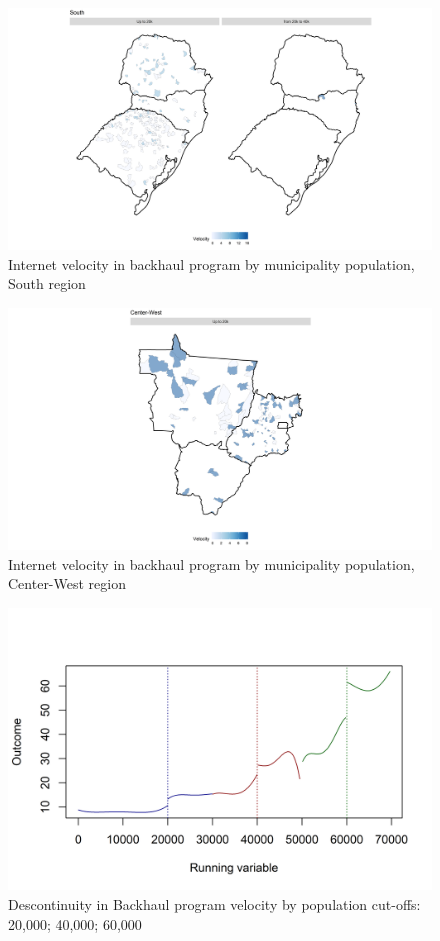 \documentclass[12pt,]{article}
\begin{document}
\begin{figure}
\centering
\includegraphics{artigo1_files/figure-latex/mapa4-1.png}
\caption{Internet velocity in backhaul program by municipality
population, South region \label{fig:1.4}}
\end{figure}

\begin{figure}
\centering
\includegraphics{artigo1_files/figure-latex/mapa5-1.png}
\caption{Internet velocity in backhaul program by municipality
population, Center-West region \label{fig:1.5}}
\end{figure}

\begin{figure}
\centering
\includegraphics{artigo1_files/figure-latex/descontinuity-1.png}
\caption{Descontinuity in Backhaul program velocity by population
cut-offs: 20,000; 40,000; 60,000 \label{fig:2}}
\end{figure}
\end{document}
